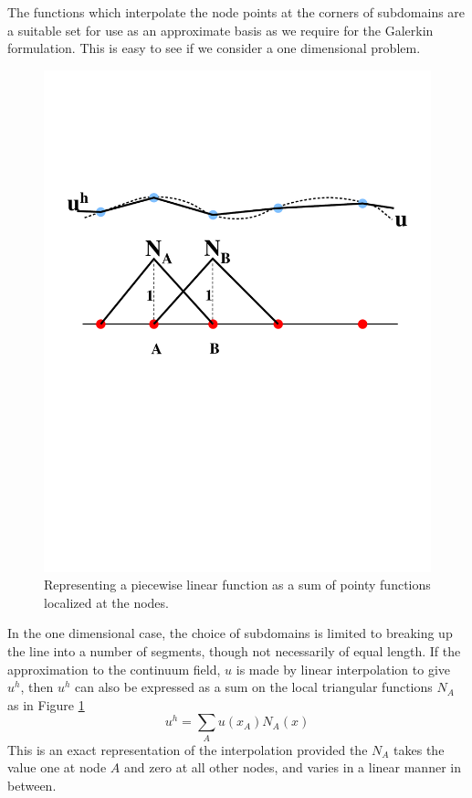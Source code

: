 \documentclass[10pt]{article}
\begin{document}
		The functions which interpolate the
		node points at the corners of  subdomains are a suitable set for
		use as an approximate basis as we require for the Galerkin
		formulation. This is easy to see if we consider a one dimensional
		problem.
		
			\begin{figure}[h]           
				\begin{center}
		 			 \includegraphics[width=0.66\linewidth]{Diagrams/linedisc.pdf}
		 			\caption[]{Representing a piecewise linear function as a sum
		 			of pointy functions localized at the nodes.}
		 			\label{fig:domain2}
		 		\end{center}
			\end{figure}	
	
		In the one dimensional case, the choice of subdomains is limited to breaking
		up the line into a number of segments, though not necessarily of equal
		length.	If the approximation to the continuum field, $u$ is made
		by linear interpolation to give $u^h$, then $u^h$ can also be
		expressed as a sum on the local triangular functions $N_A$ 
		as in Figure \ref{fig:domain2}
			\begin{equation}
				u^h = \sum_{A} u(x_A) N_A(x)
			\end{equation} 
		This is an exact representation of the interpolation provided
		the $N_A$ takes the value one at node $A$ and zero at
		all other nodes, and varies in a linear manner in between.
		
\end{document}
